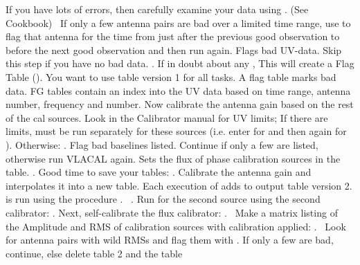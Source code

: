  If you have lots of errors, then
carefully examine your data using . (See \AIPS Cookbook)~
If only a few antenna pairs are bad over a limited time range, use
 to flag that antenna for the time from just after the previous
good  observation to before the next good  observation
and then run  again.
 Flags bad UV-data. Skip this step if you have no bad data.
.
If in doubt about any \uvdata, 
This will create a Flag Table ().  You want to use
 table version 1 for all tasks.
\tablestyle
\beddes
{} A flag table marks bad data. FG tables contain
an index into the UV data based
on time range, antenna number, frequency and \IF number.
\eeddes
\normalstyle
{} Now calibrate the antenna gain based on the
rest of the cal sources.
Look in the Calibrator manual for UV limits; If there are limits,
 must be run separately for these sources (i.e. enter  for 
and then again for ). Otherwise:
.
Flag bad baselines listed.  Continue if only a few are listed, otherwise
run VLACAL again.
 Sets the flux of phase calibration sources in the \SU table.
.
 Good time to save your tables:
.
 Calibrate the antenna gain and interpolates it into
a new \CL table.
Each execution of  adds to
output \CL table version 2.
 is run using the procedure .~
.
Run  for the second source using the second calibrator:
. Next, self-calibrate the flux calibrator: .~
 Make a matrix listing of the Amplitude and RMS of
calibration sources with calibration applied:
.~
Look for antenna pairs with wild RMSs and flag them with .
If only a few are bad, continue, else delete \CL table 2 and the \SN table

